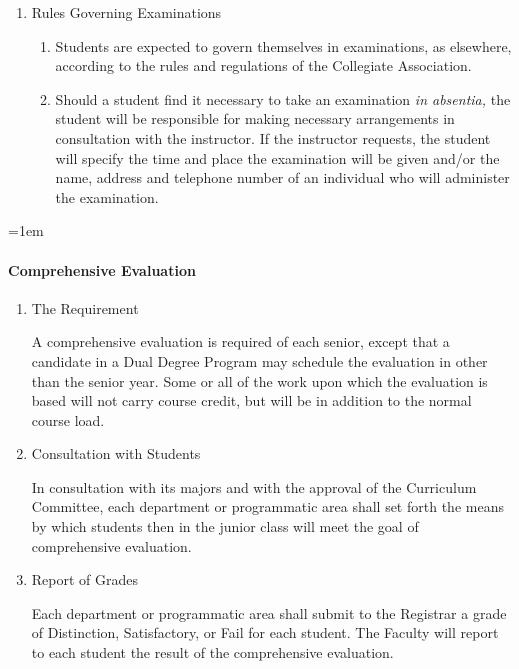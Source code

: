 \documentclass{manual}
\newcommand{\oldbreak}[1]{}
\let\oldparagraph\paragraph
\renewcommand\paragraph{\leftskip=1em\oldparagraph}
\newcommand{\itemLevelA}{\alph*.}
\newcommand{\itemLevelB}{\arabic*)}
\newcommand{\itemRefA}{\alph*}
\newcommand{\itemRefB}{\arabic*}
\begin{document}
\begin{enumerate}[label=\alph*]
\oldbreak{VII-6}

\item Rules Governing Examinations

\begin{enumerate}[label=\itemLevelB,ref=\itemRefB]
\item Students are expected to govern themselves in examinations, as elsewhere, according to the rules and regulations of the Collegiate Association.
\item Should a student find it necessary to take an examination \textit{in absentia, }the student will be responsible for making necessary arrangements in consultation with the instructor. If the instructor requests, the student will specify the time and place the examination will be given and/or the name, address and telephone number of an individual who will administer the examination.
\end{enumerate}
\end{enumerate}

\paragraph{Comprehensive Evaluation}

\begin{enumerate}[label=\itemLevelA,ref=\itemRefA]
\item The Requirement

A comprehensive evaluation is required of each senior, except that a candidate in a Dual Degree Program may schedule the evaluation in other than the senior year. Some or all of the work upon which the evaluation is based will not carry course credit, but will be in addition to the normal course load.
\item Consultation with Students

In consultation with its  majors and with the approval of the Curriculum Committee, each department or programmatic area shall  set forth the means by which students then in the junior class will meet the goal of comprehensive evaluation.

\item Report of Grades

Each department or programmatic area shall submit to the Registrar a grade of Distinction, Satisfactory, or Fail for each student. The Faculty will report to each student the result of the comprehensive evaluation.

\end{enumerate}
\end{document}
